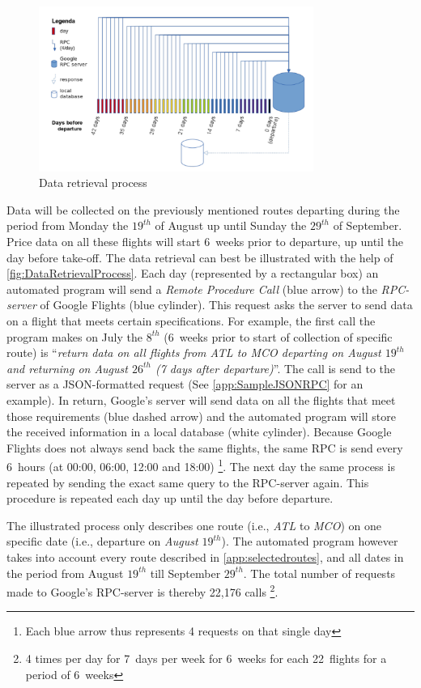 \begin{figure}
\centering
\includegraphics[width=0.8\textwidth]{figures/DataRetrievalProcess}
\caption{Data retrieval process}
\label{fig:DataRetrievalProcess}
\end{figure}

Data will be collected on the previously mentioned routes departing during the period from Monday the $19^{th}$ of August up until Sunday the $29^{th}$ of September. Price data on all these flights will start 6~weeks prior to departure, up until the day before take-off. The data retrieval can best be illustrated with the help of \autoref{fig:DataRetrievalProcess}. Each day (represented by a rectangular box) an automated program will send a \emph{Remote Procedure Call} (blue arrow) to the \emph{RPC-server} of Google Flights (blue cylinder). This request asks the server to send data on a flight that meets certain specifications. For example, the first call the program makes on July the $8^{th}$ (6~weeks prior to start of collection of specific route) is ``\emph{return data on all flights from ATL to MCO departing on August $19^{th}$ and returning on August $26^{th}$ (7 days after departure)}''. The call is send to the server as a JSON-formatted request (See \autoref{app:SampleJSONRPC} for an example). In return, Google's server will send data on all the flights that meet those requirements (blue dashed arrow) and the automated program will store the received information in a local database (white cylinder). Because Google Flights does not always send back the same flights, the same RPC is send every 6~hours (at 00:00, 06:00, 12:00 and 18:00) \footnote{Each blue arrow thus represents 4 requests on that single day}. The next day the same process is repeated by sending the exact same query to the RPC-server again. This procedure is repeated each day up until the day before departure.

The illustrated process only describes one route (i.e., \emph{ATL} to \emph{MCO}) on one specific date (i.e., departure on \emph{August $19^{th}$}). The automated program however takes into account every route described in \autoref{app:selectedroutes}, and all dates in the period from August $19^{th}$ till September $29^{th}$. The total number of requests made to Google's RPC-server is thereby 22,176 calls \footnote{4 times per day for 7~days per week for 6~weeks for each 22~flights for a period of 6~weeks}.


